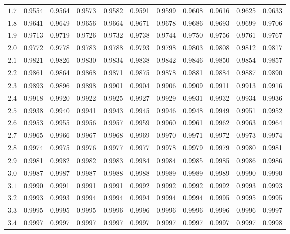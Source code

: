 \begin{table}[H]
\begin{tabular}{c|cccccccccc}
$1.7$ & 0.9554 & 0.9564 & 0.9573 & 0.9582 & 0.9591 & 0.9599 & 0.9608 & 0.9616 & 0.9625 & 0.9633 \\
$1.8$ & 0.9641 & 0.9649 & 0.9656 & 0.9664 & 0.9671 & 0.9678 & 0.9686 & 0.9693 & 0.9699 & 0.9706 \\
$1.9$ & 0.9713 & 0.9719 & 0.9726 & 0.9732 & 0.9738 & 0.9744 & 0.9750 & 0.9756 & 0.9761 & 0.9767 \\
$2.0$ & 0.9772 & 0.9778 & 0.9783 & 0.9788 & 0.9793 & 0.9798 & 0.9803 & 0.9808 & 0.9812 & 0.9817 \\
$2.1$ & 0.9821 & 0.9826 & 0.9830 & 0.9834 & 0.9838 & 0.9842 & 0.9846 & 0.9850 & 0.9854 & 0.9857 \\
$2.2$ & 0.9861 & 0.9864 & 0.9868 & 0.9871 & 0.9875 & 0.9878 & 0.9881 & 0.9884 & 0.9887 & 0.9890 \\
$2.3$ & 0.9893 & 0.9896 & 0.9898 & 0.9901 & 0.9904 & 0.9906 & 0.9909 & 0.9911 & 0.9913 & 0.9916 \\
$2.4$ & 0.9918 & 0.9920 & 0.9922 & 0.9925 & 0.9927 & 0.9929 & 0.9931 & 0.9932 & 0.9934 & 0.9936 \\
$2.5$ & 0.9938 & 0.9940 & 0.9941 & 0.9943 & 0.9945 & 0.9946 & 0.9948 & 0.9949 & 0.9951 & 0.9952 \\
$2.6$ & 0.9953 & 0.9955 & 0.9956 & 0.9957 & 0.9959 & 0.9960 & 0.9961 & 0.9962 & 0.9963 & 0.9964 \\
$2.7$ & 0.9965 & 0.9966 & 0.9967 & 0.9968 & 0.9969 & 0.9970 & 0.9971 & 0.9972 & 0.9973 & 0.9974 \\
$2.8$ & 0.9974 & 0.9975 & 0.9976 & 0.9977 & 0.9977 & 0.9978 & 0.9979 & 0.9979 & 0.9980 & 0.9981 \\
$2.9$ & 0.9981 & 0.9982 & 0.9982 & 0.9983 & 0.9984 & 0.9984 & 0.9985 & 0.9985 & 0.9986 & 0.9986 \\
$3.0$ & 0.9987 & 0.9987 & 0.9987 & 0.9988 & 0.9988 & 0.9989 & 0.9989 & 0.9989 & 0.9990 & 0.9990 \\
$3.1$ & 0.9990 & 0.9991 & 0.9991 & 0.9991 & 0.9992 & 0.9992 & 0.9992 & 0.9992 & 0.9993 & 0.9993 \\
$3.2$ & 0.9993 & 0.9993 & 0.9994 & 0.9994 & 0.9994 & 0.9994 & 0.9994 & 0.9995 & 0.9995 & 0.9995 \\
$3.3$ & 0.9995 & 0.9995 & 0.9995 & 0.9996 & 0.9996 & 0.9996 & 0.9996 & 0.9996 & 0.9996 & 0.9997 \\
$3.4$ & 0.9997 & 0.9997 & 0.9997 & 0.9997 & 0.9997 & 0.9997 & 0.9997 & 0.9997 & 0.9997 & 0.9998 \\
\end{tabular}
\end{table}

